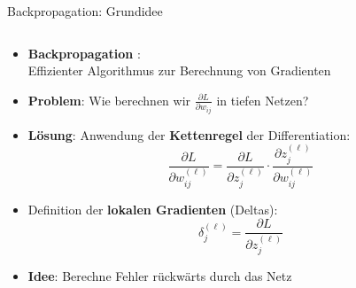 \documentclass[aspectratio=1610, xcolor=dvipsnames, 9pt]{beamer}
\begin{document}
      \begin{frame}{Backpropagation: Grundidee}
        \begin{columns}
          \begin{column}{1\textwidth}
            \begin{itemize}
              \item \textbf{Backpropagation} \cite{rumelhart1986}: \\
                    Effizienter Algorithmus zur Berechnung von Gradienten
              \item \textbf{Problem}: Wie berechnen wir $\frac{\partial L}{\partial w_{ij}}$ in tiefen Netzen?
              \item \textbf{Lösung}: Anwendung der \textbf{Kettenregel} der Differentiation:
              \begin{equation}
                \frac{\partial L}{\partial w_{ij}^{(\ell)}} = \frac{\partial L}{\partial z_j^{(\ell)}} \cdot \frac{\partial z_j^{(\ell)}}{\partial w_{ij}^{(\ell)}}
              \end{equation}
              \item Definition der \textbf{lokalen Gradienten} (Deltas):
              \begin{equation}
                \delta_j^{(\ell)} = \frac{\partial L}{\partial z_j^{(\ell)}}
              \end{equation}
              \item \textbf{Idee}: Berechne Fehler rückwärts durch das Netz
            \end{itemize}
          \end{column}
        \end{columns}
      \end{frame}
\end{document}

